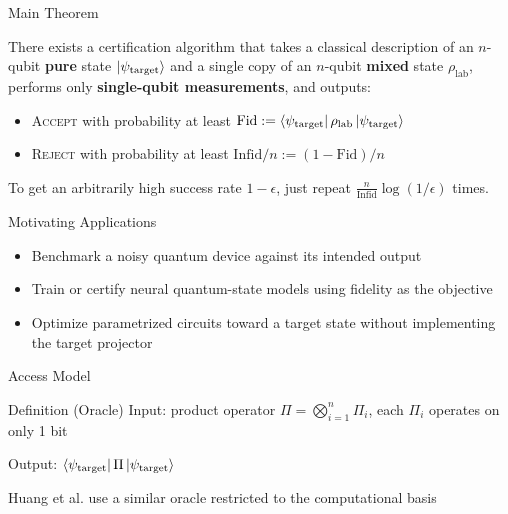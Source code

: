 \begin{frame}{Main Theorem}
    \begin{theorem}
      There exists a certification algorithm that takes a classical description of an $n$-qubit {\bf pure} state $\ket{\psi_{\text{target}}}$ and a single copy of an $n$-qubit {\bf mixed} state $\rho_{\text{lab}}$, performs only {\bf single-qubit measurements}, and outputs:
        \begin{itemize}
            \item \textsc{Accept} with probability at least
            $\mathrm{Fid} := \bra{\psi_{\text{target}}}\rho_{\text{lab}}\ket{\psi_{\text{target}}}$
            \item \textsc{Reject} with probability at least
            $\mathrm{Infid}/n := (1-\mathrm{Fid})/n$
        \end{itemize}
    \end{theorem}

    \pause
    To get an arbitrarily high success rate $1 - \epsilon$, just repeat $\frac n {\mathrm{Infid}} \log(1/\epsilon)$ times.
\end{frame}

\begin{frame}{Motivating Applications}
    \begin{center}
        \resizebox{0.86\textwidth}{!}{}
    \end{center}

    \begin{itemize}
        \item Benchmark a noisy quantum device against its intended output
        \item Train or certify neural quantum-state models using fidelity as the objective
        \item Optimize parametrized circuits toward a target state without implementing the target projector
    \end{itemize}
\end{frame}

\begin{frame}{Access Model}
  \begin{block}{Definition (Oracle)}
    Input: product operator $ \Pi=\bigotimes_{i=1}^n \Pi_i $, each $\Pi_i$ operates on only 1 bit
      \pause

      \vspace{0.5em}
      Output: $ \bra{\psi_{\text{target}}}\Pi\ket{\psi_{\text{target}}}$
    \end{block}

    \pause
    \vspace{0.5em}
        Huang et al. use a similar oracle restricted to the computational basis
\end{frame}

